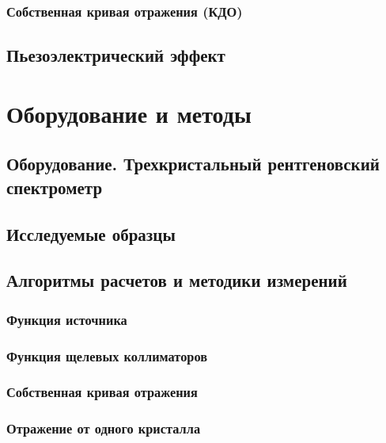 \documentclass[pdftex,a4paper,14pt,english,russian]{extarticle}
\numberwithin{equation}{subsection}
\newcounter{subsubsubsection}[subsubsection]
\begin{document}
    \subsubsection{Собственная кривая отражения (КДО)}
      
  \subsection{Пьезоэлектрический эффект}
    

\newpage
\section{Оборудование и методы}
  \subsection{Оборудование. Трехкристальный рентгеновский спектрометр}
    
  \subsection{Исследуемые образцы}
      
  \subsection{Алгоритмы расчетов и методики измерений}
    
    \subsubsection{Функция источника}
      
    \subsubsection{Функция щелевых коллиматоров}
      
    \subsubsection{Собственная кривая отражения}
      
    \subsubsection{Отражение от одного кристалла}
      
\end{document}
